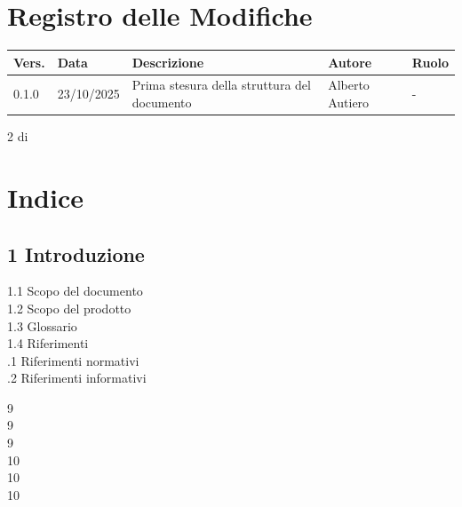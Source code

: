 \documentclass[a4paper,11pt]{article}
\begin{document}
\newpage

\section*{Registro delle Modifiche}

{\footnotesize
\begin{center}
\begin{tabular}{|l|l|l|l|l|}
\hline
\textbf{Vers.} & \textbf{Data} & \textbf{Descrizione} & \textbf{Autore} & \textbf{Ruolo} \\
\hline
0.1.0 & 23/10/2025 & Prima stesura della struttura del documento & Alberto Autiero & - \\
\hline
\end{tabular}
\end{center}
}

\vfill
\begin{center}
2 di \pageref{LastPage}
\end{center}

\newpage

\section*{Indice}

\noindent
\begin{minipage}[t]{0.8\textwidth}
\subsection*{1 Introduzione}
1.1 Scopo del documento \\
1.2 Scopo del prodotto \\
1.3 Glossario \\
1.4 Riferimenti \\
.1 Riferimenti normativi \\
.2 Riferimenti informativi \\
\end{minipage}
\begin{minipage}[t]{0.2\textwidth}
\vspace{1.65\baselineskip}
9 \\
9 \\
9 \\
10 \\
10 \\
10 \\
\end{minipage}

\newpage
\end{document}
